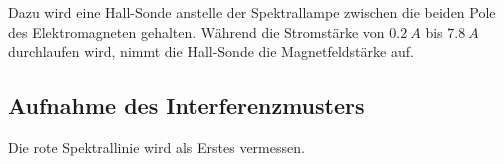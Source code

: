     Dazu wird eine Hall-Sonde anstelle der Spektrallampe zwischen die beiden Pole des Elektromagneten gehalten.
    Während die Stromstärke von $\SI{0,2}{A}$ bis $\SI{7,8}{A}$ durchlaufen wird, nimmt die Hall-Sonde die Magnetfeldstärke auf.

\subsection{Aufnahme des Interferenzmusters}
    Die rote Spektrallinie wird als Erstes vermessen.
